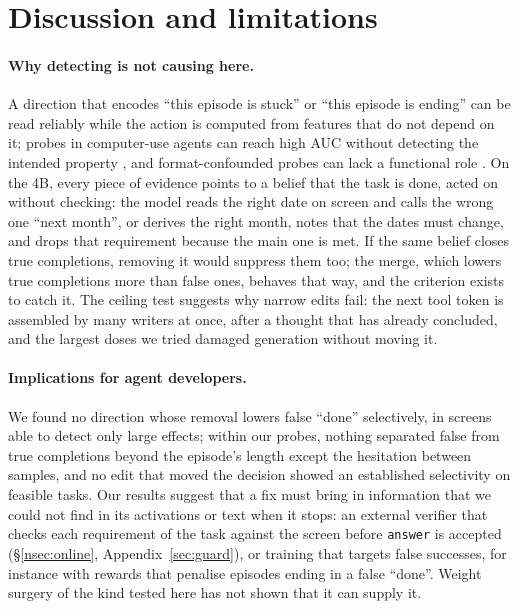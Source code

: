 \section{Discussion and limitations}
\label{nsec:disc}
\paragraph{Why detecting is not causing here.} A direction that encodes ``this episode is stuck'' or ``this episode is ending'' can be read reliably while the action is computed from features that do not depend on it; probes in computer-use agents can reach high AUC without detecting the intended property \citep{li2026auc}, and format-confounded probes can lack a functional role \citep{sahoo2026format}. On the 4B, every piece of evidence points to a belief that the task is done, acted on without checking: the model reads the right date on screen and calls the wrong one ``next month'', or derives the right month, notes that the dates must change, and drops that requirement because the main one is met. If the same belief closes true completions, removing it would suppress them too; the merge, which lowers true completions more than false ones, behaves that way, and the \fsm{} criterion exists to catch it. The ceiling test suggests why narrow edits fail: the next tool token is assembled by many writers at once, after a thought that has already concluded, and the largest doses we tried damaged generation without moving it.

\paragraph{Implications for agent developers.} We found no direction whose removal lowers false ``done'' selectively, in screens able to detect only large effects; within our probes, nothing separated false from true completions beyond the episode's length except the hesitation between samples, and no edit that moved the decision showed an established selectivity on feasible tasks. Our results suggest that a fix must bring in information that we could not find in its activations or text when it stops: an external verifier that checks each requirement of the task against the screen before \texttt{answer} is accepted (\S\ref{nsec:online}, Appendix~\ref{sec:guard}), or training that targets false successes, for instance with rewards that penalise episodes ending in a false ``done''. Weight surgery of the kind tested here has not shown that it can supply it.

